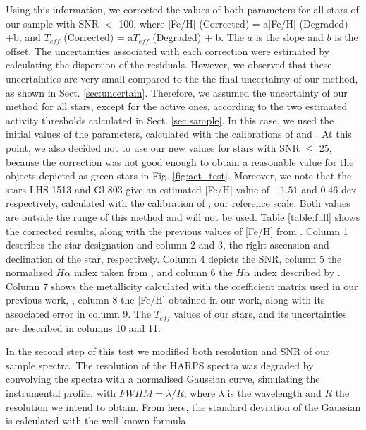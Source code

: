 \documentclass[referee]{aa}
\begin{document}
Using this information, we corrected the values of both parameters for all stars of our sample with SNR $<$ 100, where [Fe/H] (Corrected) = a[Fe/H] (Degraded) +b, and $T_{eff}$ (Corrected) = a$T_{eff}$ (Degraded) + b. The $a$ is the slope and $b$ is the offset. The uncertainties associated with each correction were estimated by calculating the dispersion of the residuals. However, we observed that these uncertainties are very small compared to the the final uncertainty of our method, as shown in Sect. \ref{sec:uncertain}. Therefore, we assumed the uncertainty of our method for all stars, except for the active ones, according to the two estimated activity thresholds calculated in Sect. \ref{sec:sample}. In this case, we used the initial values of the parameters, calculated with the calibrations of \citet{Neves-2012} and \citet{Casagrande-2008}. At this point, we also decided not to use our new values for stars with SNR $\leq$ 25, because the correction was not good enough to obtain a reasonable value for the objects depicted as green stars in Fig. \ref{fig:act_test}. Moreover, we note that the stars LHS 1513 and Gl 803 give an estimated [Fe/H] value of $-1.51$ and $0.46$ dex respectively, calculated with the calibration of \citet{Neves-2012}, our reference scale. Both values are outside the range of this method and will not be used. Table \ref{table:full} shows the corrected results, along with the previous values of [Fe/H] from \citet{Neves-2013}. Column 1 describes the star designation and column 2 and 3, the right ascension and declination of the star, respectively. Column 4 depicts the SNR, column 5 the normalized $H\alpha$ index taken from \citet{Reiners-2012}, and column 6 the $H\alpha$ index described by \citet{Gomes_da_Silva-2011}. Column 7 shows the metallicity calculated with the coefficient matrix used in our previous work, \citet{Neves-2013}, column 8 the [Fe/H] obtained in our work, along with its associated error in column 9. The $T_{eff}$ values of our stars, and its uncertainties are described in columns 10 and 11.    %

\addtocounter{table}{1}


In the second step of this test we modified both resolution and SNR of our sample spectra. The resolution of the HARPS spectra was degraded by convolving the spectra with a normalised Gaussian curve, simulating the instrumental profile, with $FWHM = \lambda/R$, where $\lambda$ is the wavelength and $R$ the resolution we intend to obtain. %
From here, the standard deviation of the Gaussian is calculated with the well known formula 
\end{document}

